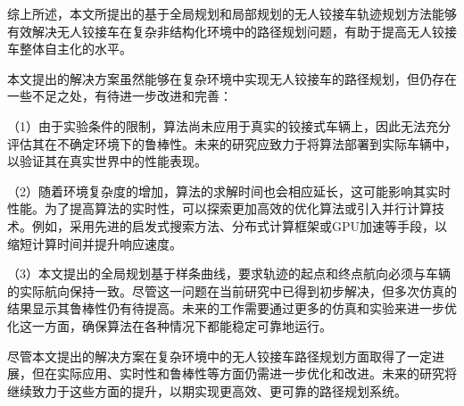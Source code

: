 \documentclass[master,academic]{ysuthesis} %
\begin{document}
	综上所述，本文所提出的基于全局规划和局部规划的无人铰接车轨迹规划方法能够有效解决无人铰接车在复杂非结构化环境中的路径规划问题，有助于提高无人铰接车整体自主化的水平。

	本文提出的解决方案虽然能够在复杂环境中实现无人铰接车的路径规划，但仍存在一些不足之处，有待进一步改进和完善：

	（1）由于实验条件的限制，算法尚未应用于真实的铰接式车辆上，因此无法充分评估其在不确定环境下的鲁棒性。未来的研究应致力于将算法部署到实际车辆中，以验证其在真实世界中的性能表现。

	（2）随着环境复杂度的增加，算法的求解时间也会相应延长，这可能影响其实时性能。为了提高算法的实时性，可以探索更加高效的优化算法或引入并行计算技术。例如，采用先进的启发式搜索方法、分布式计算框架或GPU加速等手段，以缩短计算时间并提升响应速度。

	（3）本文提出的全局规划基于样条曲线，要求轨迹的起点和终点航向必须与车辆的实际航向保持一致。尽管这一问题在当前研究中已得到初步解决，但多次仿真的结果显示其鲁棒性仍有待提高。未来的工作需要通过更多的仿真和实验来进一步优化这一方面，确保算法在各种情况下都能稳定可靠地运行。

	尽管本文提出的解决方案在复杂环境中的无人铰接车路径规划方面取得了一定进展，但在实际应用、实时性和鲁棒性等方面仍需进一步优化和改进。未来的研究将继续致力于这些方面的提升，以期实现更高效、更可靠的路径规划系统。
																					  

\end{document}
